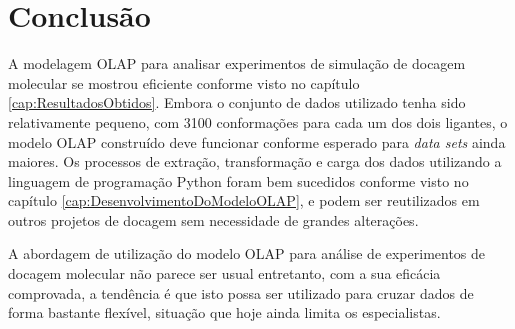 \chapter{Conclusão}

A modelagem OLAP para analisar experimentos de simulação de docagem molecular se mostrou eficiente conforme visto no capítulo \ref{cap:ResultadosObtidos}. Embora o conjunto de dados utilizado tenha sido relativamente pequeno, com 3100 conformações para cada um dos dois ligantes, o modelo OLAP construído deve funcionar conforme esperado para \emph{data sets} ainda maiores. Os processos de extração, transformação e carga dos dados utilizando a linguagem de programação Python foram bem sucedidos conforme visto no capítulo \ref{cap:DesenvolvimentoDoModeloOLAP}, e podem ser reutilizados em outros projetos de docagem sem necessidade de grandes alterações. 

A abordagem de utilização do modelo OLAP para análise de experimentos de docagem molecular não parece ser usual entretanto, com a sua eficácia comprovada, a tendência é que isto possa ser utilizado para cruzar dados de forma bastante flexível, situação que hoje ainda limita os especialistas.
